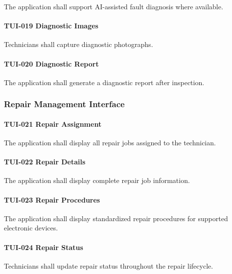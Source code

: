 The application shall support AI-assisted fault diagnosis where
available.

\paragraph{TUI-019 Diagnostic Images}

Technicians shall capture diagnostic photographs.

\paragraph{TUI-020 Diagnostic Report}

The application shall generate a diagnostic report after inspection.


\subsubsection*{Repair Management Interface}

\paragraph{TUI-021 Repair Assignment}

The application shall display all repair jobs assigned to the technician.

\paragraph{TUI-022 Repair Details}

The application shall display complete repair job information.

\paragraph{TUI-023 Repair Procedures}

The application shall display standardized repair procedures for
supported electronic devices.

\paragraph{TUI-024 Repair Status}

Technicians shall update repair status throughout the repair lifecycle.

